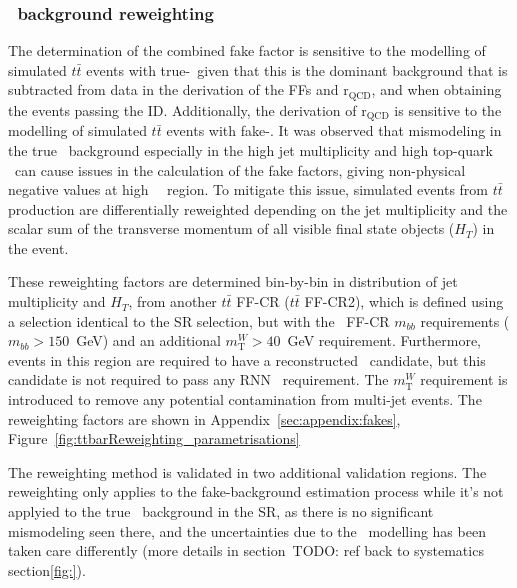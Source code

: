 \subsubsection{\ttbar\ background reweighting}
\label{sec:ttbar-reweighting}
The determination of the combined fake factor 
is sensitive to the modelling of simulated $t\bar{t}$ events with true-\tauhad\
given that this is the dominant background that is subtracted from data in the derivation of
the FFs and $\mathrm{r}_\text{QCD}$, and when obtaining the events passing the ID. 
Additionally, the derivation of $\mathrm{r}_\text{QCD}$ is sensitive to the 
modelling of simulated $t\bar{t}$ events with fake-\tauhad.
It was observed that mismodeling in the true \ttbar\ background 
especially in the high jet multiplicity and high top-quark \pt\ 
can cause issues in the calculation of the fake factors, 
giving non-physical negative values at high \tauhad\ \pt\ region. 
To mitigate this issue,
simulated events from $t\bar{t}$ production are differentially reweighted
depending on the jet multiplicity and the scalar sum of the transverse momentum of all visible
final state objects ($H_T$) in the event.

These reweighting factors are determined bin-by-bin 
in distribution of jet multiplicity and $H_T$,
from another $t\bar{t}$ FF-CR ($t\bar{t}$ FF-CR2),
which is defined using a selection identical to the SR selection,
but with the \ttbar\ FF-CR $m_{bb}$ requirements ($m_{bb}>150$~GeV)
and an additional $m^{W}_\text{T}>40$~GeV requirement. 
Furthermore, events in this region are required
to have a reconstructed \tauhad\ candidate, but this candidate is not required
to pass any RNN \tauhad\ requirement.
The $m^{W}_\text{T}$ requirement is introduced to remove any potential contamination from multi-jet events.
The reweighting factors are shown in Appendix~\ref{sec:appendix:fakes}, 
Figure~\ref{fig:ttbarReweighting_parametrisations}

The reweighting method is validated in two additional validation regions.
The reweighting only applies to the fake-background estimation process
while it's not applyied to the true \ttbar\ background in the SR, 
as there is no significant mismodeling seen there, and
the uncertainties due to the \ttbar\ modelling has been taken care differently 
(more details in section~TODO: ref back to systematics section\ref{fig:}).   


